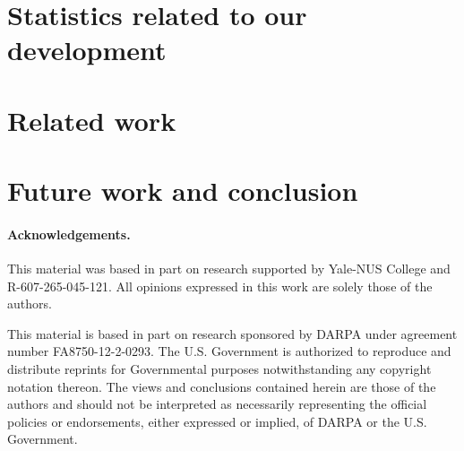 \documentclass[preprint,10pt]{sigplanconf}
\begin{document}
\section{Statistics related to our development}
\label{sec:development}



\section{Related work}
\label{sec:related}



\section{Future work and conclusion}
\label{sec:future}
\label{sec:conclusion}



\paragraph{Acknowledgements.} This material was based in part on research supported by Yale-NUS College and R-607-265-045-121.  All opinions expressed in this work are solely those of the authors.

This material is based in part on research sponsored by DARPA under agreement number
FA8750-12-2-0293. The U.S. Government is authorized to reproduce
and distribute reprints for Governmental purposes notwithstanding
any copyright notation thereon. The views and conclusions contained
herein are those of the authors and should not be interpreted as
necessarily representing the official policies or endorsements,
either expressed or implied, of DARPA or the U.S. Government.


%



\end{document}
